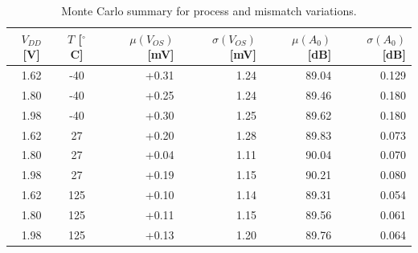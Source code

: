 \begin{table}[H]
\centering
\caption{Monte Carlo summary for process and mismatch variations.}
\label{tab:mc_summary}
\small
\begin{tabular}{ccrrrr}
\toprule
$V_{DD}$ [V] & $T$ [$^\circ$C] & $\mu(V_{OS})$ [mV] & $\sigma(V_{OS})$ [mV] & $\mu(A_0)$ [dB] & $\sigma(A_0)$ [dB] \\
\midrule
1.62 & -40 & +0.31 & 1.24 & 89.04 & 0.129 \\
1.80 & -40 & +0.25 & 1.24 & 89.46 & 0.180 \\
1.98 & -40 & +0.30 & 1.25 & 89.62 & 0.180 \\
1.62 & 27 & +0.20 & 1.28 & 89.83 & 0.073 \\
1.80 & 27 & +0.04 & 1.11 & 90.04 & 0.070 \\
1.98 & 27 & +0.19 & 1.15 & 90.21 & 0.080 \\
1.62 & 125 & +0.10 & 1.14 & 89.31 & 0.054 \\
1.80 & 125 & +0.11 & 1.15 & 89.56 & 0.061 \\
1.98 & 125 & +0.13 & 1.20 & 89.76 & 0.064 \\
\bottomrule
\end{tabular}
\end{table}
